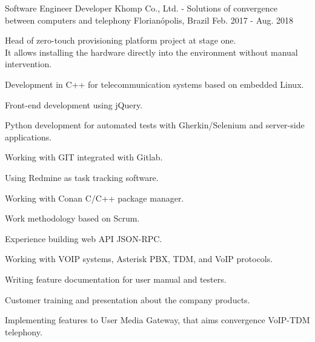 \begin{cventries}
  \cventry
    {Software Engineer Developer} %
    {Khomp Co., Ltd. - Solutions of convergence between computers and telephony} %
    {Florianópolis, Brazil} %
    {Feb. 2017 - Aug. 2018} %
    {
      \begin{cvitems} %
        \item {Head of zero-touch provisioning platform project at stage one. \\
	It allows installing the hardware directly into the environment without manual intervention.}
        \item {Development in C++ for telecommunication systems based on embedded Linux.}
        \item {Front-end development using jQuery.}
        \item {Python development for automated tests with Gherkin/Selenium and server-side applications.}
        \item {Working with GIT integrated with Gitlab.}
        \item {Using Redmine as task tracking software.}
        \item {Working with Conan C/C++ package manager.}
        \item {Work methodology based on Scrum.}
        \item {Experience building web API JSON-RPC.}
        \item {Working with VOIP systems, Asterisk PBX, TDM, and VoIP protocols.}
        \item {Writing feature documentation for user manual and testers.}
        \item {Customer training and presentation about the company products.}
        \item {Implementing features to User Media Gateway, that aims convergence VoIP-TDM telephony.}
      \end{cvitems}
    }


\end{cventries}
